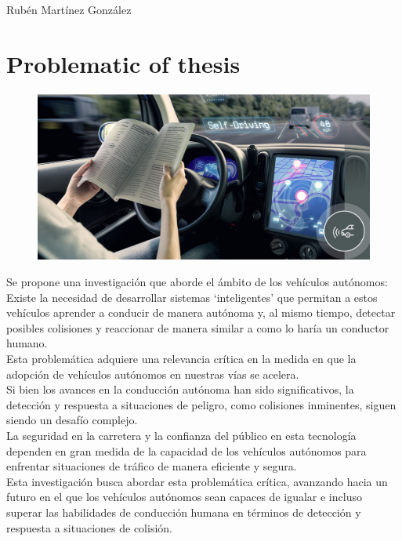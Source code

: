 \documentclass[10pt,letterpaper,final]{article}
\begin{document}
    \section*{}
    Rubén Martínez González
    \section*{Problematic of thesis}
    \begin{figure}[!ht]
        \includegraphics[width=\textwidth]{img/1}\label{fig:self-driving}
    \end{figure}
    \newline
    \noindent Se propone una investigación que aborde el ámbito de los vehículos autónomos:\\ \newline
    Existe la necesidad de desarrollar sistemas ‘inteligentes' que permitan a estos vehículos aprender a conducir de manera autónoma y,
    al mismo tiempo, detectar posibles colisiones y reaccionar de manera similar a como lo haría un conductor humano.\\ \newline
    Esta problemática adquiere una relevancia crítica en la medida en que la adopción de vehículos autónomos en nuestras vías se acelera.\\ \newline
    Si bien los avances en la conducción autónoma han sido significativos, la detección y respuesta a
    situaciones de peligro, como colisiones inminentes, siguen siendo un desafío complejo.\\ \newline
    La seguridad en la carretera y la confianza del público en esta tecnología dependen en gran medida de la capacidad
    de los vehículos autónomos para enfrentar situaciones de tráfico de manera eficiente y segura.\\ \newline
    Esta investigación busca abordar esta problemática crítica, avanzando hacia un futuro en el que los vehículos autónomos
    sean capaces de igualar e incluso superar las habilidades de conducción humana en términos de detección y respuesta
    a situaciones de colisión.
    \clearpage
    
\end{document}

